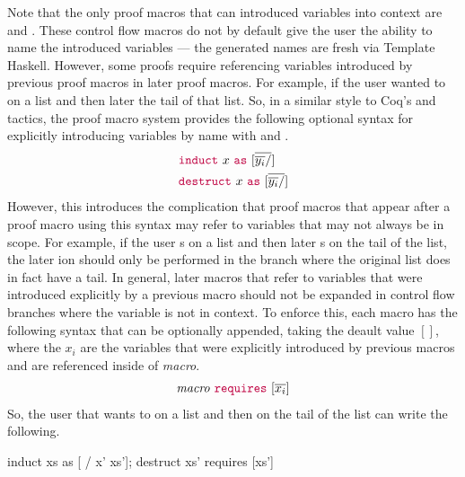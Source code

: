Note that the only proof macros that can introduced variables into context are
 and . These control flow macros do not by default
give the user the ability to name the introduced variables --- the generated
names are fresh via Template Haskell. However, some proofs require referencing
variables introduced by previous proof macros in later proof macros. For
example, if the user wanted to  on a list and then later
 the tail of that list. So, in a similar style to Coq's
 and  tactics, the proof macro system provides the
following optional syntax for explicitly introducing variables by name with
 and .
\begin{align*}
  & {\color{purple}\mathtt{induct}} ~ x ~ {\color{purple}\mathtt{as}} ~ \mathtt{[} \overline{ \overline{y_i} / } \mathtt{]}
  \\
  & {\color{purple}\mathtt{destruct}} ~ x ~ {\color{purple}\mathtt{as}} ~ \mathtt{[} \overline{ \overline{y_i} / } \mathtt{]}
\end{align*}
However, this introduces the complication that proof macros that appear after a
proof macro using this syntax may refer to variables that may not always be in
scope. For example, if the user s on a list and then later
s on the tail of the list, the later ion should
only be performed in the branch where the original list does in fact have a
tail. In general, later macros that refer to variables that were introduced
explicitly by a previous macro should not be expanded in control flow branches
where the variable is not in context. To enforce this, each macro has the
following syntax that can be optionally appended, taking the deault value $[]$,
where the $x_i$ are the variables that were explicitly introduced by previous
macros and are referenced inside of \textit{macro}.
\begin{align*}
  \mathit{macro} ~ {\color{purple}\mathtt{requires}} ~ \mathtt{[} \overline{x_i} \mathtt{]}
\end{align*}
So, the user that wants to  on a list  and then
 on the tail of the list can write the following.
\begin{code}
  induct xs as [ / x' xs'];
  destruct xs' requires [xs']
\end{code}


